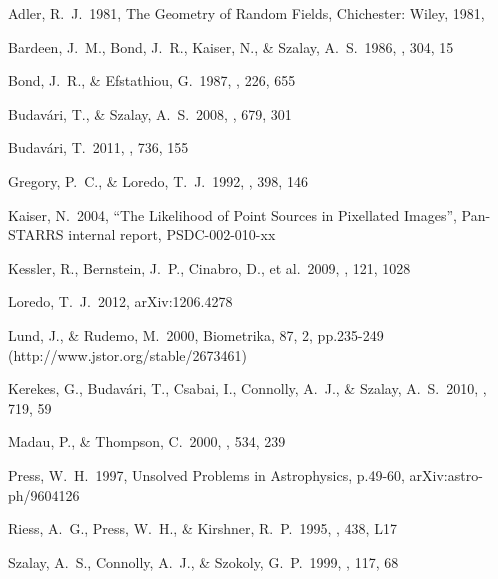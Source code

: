 \documentclass[twocolumn]{emulateapj}
\begin{document}
\begin{thebibliography}{}

 Adler, R.~J.\ 1981, The Geometry of Random Fields, Chichester: Wiley, 1981,  

 Bardeen, J.~M., Bond, J.~R., Kaiser, N., \& Szalay, A.~S.\ 1986, \apj, 304, 15 

 Bond, J.~R., \& Efstathiou, G.\ 1987, \mnras, 226, 655

 Budav{\'a}ri, T., \& Szalay, A.~S.\ 2008, \apj, 679, 301

 Budav{\'a}ri, T.\ 2011, 
\apj, 736, 155 

 Gregory, P.~C., \& Loredo, T.~J.\ 1992, \apj, 398, 146


 Kaiser, N.\ 2004, ``The Likelihood of Point Sources in Pixellated Images'', Pan-STARRS internal report, PSDC-002-010-xx

 Kessler, R., Bernstein, J.~P., Cinabro, D., et al.\ 2009, \pasp, 121, 1028 

 Loredo, T.~J.\ 2012, arXiv:1206.4278 

 Lund, J., \& Rudemo, M.\ 2000, Biometrika, 87, 2, pp.235-249 (http://www.jstor.org/stable/2673461)

 Kerekes, G., Budav{\'a}ri, T., Csabai, I., Connolly, A.~J., \& Szalay, A.~S.\ 2010, \apj, 719, 59 

 Madau, P., \& Thompson, C.\ 2000, \apj, 534, 239 

 Press, W.~H.\ 1997, Unsolved Problems in Astrophysics, p.49-60, arXiv:astro-ph/9604126

 Riess, A.~G., Press, W.~H., \& Kirshner, R.~P.\ 1995, \apjl, 438, L17 

 Szalay, A.~S., Connolly, A.~J., \& Szokoly, G.~P.\ 1999, \aj, 117, 68 





\end{thebibliography}
\end{document}
